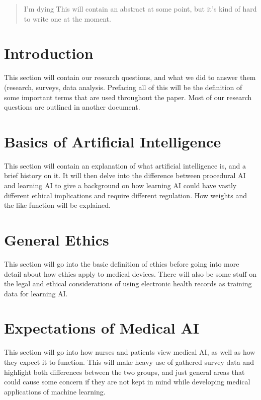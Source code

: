 \documentclass[]{article}
\title{}
\author{}
\begin{document}
	
	\maketitle
	
	\begin{abstract}
		I'm dying This will contain an abstract at some point, but it’s kind of hard to write one at the moment.
	\end{abstract}
	
	\section{Introduction}
		This section will contain our research questions, and what we did to answer them (research, surveys, data analysis. Prefacing all of this will be the definition of some important terms that are used throughout the paper. Most of our research questions are outlined in another document.
		
	\section{Basics of Artificial Intelligence}
		This section will contain an explanation of what artificial intelligence is, and a brief history on it. It will then delve into the difference between procedural AI and learning AI to give a background on how learning AI could have vastly different ethical implications and require different regulation. How weights and the like function will be explained.

	\section{General Ethics}
		This section will go into the basic definition of ethics before going into more detail about how ethics apply to medical devices. There will also be some stuff on the legal and ethical considerations of using electronic health records as training data for learning AI.

	\section{Expectations of Medical AI}
		This section will go into how nurses and patients view medical AI, as well as how they expect it to function. This will make heavy use of gathered survey data and highlight both differences between the two groups, and just general areas that could cause some concern if they are not kept in mind while developing medical applications of machine learning.
\end{document}
